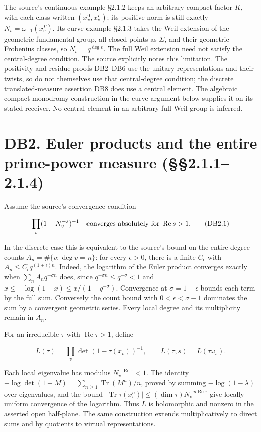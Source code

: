 \documentclass[
]{report}
\begin{document}
The source's continuous example §2.1.2 keeps an arbitrary compact factor
\(K\), with each class written \((x_v^0,x_v^\Gamma)\); its positive norm
is still exactly \(N_v=\omega_{-1}(x_v^\Gamma)\). Its curve example
§2.1.3 takes the Weil extension of the geometric fundamental group, all
closed points as \(\Sigma\), and their geometric Frobenius classes, so
\(N_v=q^{\deg v}\). The full Weil extension need not satisfy the
central-degree condition. The source explicitly notes this limitation.
The positivity and residue proofs DB2--DB6 use the unitary
representations and their twists, so do not themselves use that
central-degree condition; the discrete translated-measure assertion DB8
does use a central element. The algebraic compact monodromy construction
in the curve argument below supplies it on its stated receiver. No
central element in an arbitrary full Weil group is inferred.

\section{DB2. Euler products and the entire prime-power measure
(§§2.1.1--2.1.4)}\label{db2.-euler-products-and-the-entire-prime-power-measure-2.1.12.1.4}

Assume the source's convergence condition

\[
 \prod_v(1-N_v^{-s})^{-1}
 \quad\hbox{converges absolutely for }\operatorname{Re}s>1.
 \tag{DB2.1}
\]

In the discrete case this is equivalent to the source's bound on the
entire degree counts \(A_n=\#\{v:\deg v=n\}\): for every \(\epsilon>0\),
there is a finite \(C_\epsilon\) with
\(A_n\leq C_\epsilon q^{(1+\epsilon)n}\). Indeed, the logarithm of the
Euler product converges exactly when \(\sum_n A_nq^{-\sigma n}\) does,
since \(q^{-\sigma n}\leq q^{-\sigma}<1\) and
\(x\leq-\log(1-x)\leq x/(1-q^{-\sigma})\). Convergence at
\(\sigma=1+\epsilon\) bounds each term by the full sum. Conversely the
count bound with \(0<\epsilon<\sigma-1\) dominates the sum by a
convergent geometric series. Every local degree and its multiplicity
remain in \(A_n\).

For an irreducible \(\tau\) with \(\operatorname{Re}\tau>1\), define

\[
 L(\tau)=\prod_v\det(1-\tau(x_v))^{-1},\qquad
 L(\tau,s)=L(\tau\omega_s).
 \tag{DB2.2}
\]

Each local eigenvalue has modulus \(N_v^{-\operatorname{Re}\tau}<1\).
The identity \(-\log\det(1-M)=\sum_{n\geq1}\operatorname{Tr}(M^n)/n\),
proved by summing \(-\log(1-\lambda)\) over eigenvalues, and the bound
\(|\operatorname{Tr}\tau(x_v^n)|\leq(\dim\tau)N_v^{-n\operatorname{Re}\tau}\)
give locally uniform convergence of the logarithm. Thus \(L\) is
holomorphic and nonzero in the asserted open half-plane. The same
construction extends multiplicatively to direct sums and by quotients to
virtual representations.
\end{document}
